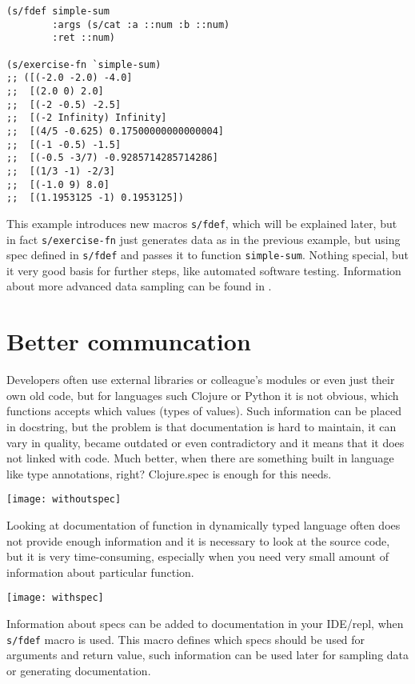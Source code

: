 \begin{verbatim}
(s/fdef simple-sum
        :args (s/cat :a ::num :b ::num)
        :ret ::num)

(s/exercise-fn `simple-sum)
;; ([(-2.0 -2.0) -4.0]
;;  [(2.0 0) 2.0]
;;  [(-2 -0.5) -2.5]
;;  [(-2 Infinity) Infinity]
;;  [(4/5 -0.625) 0.17500000000000004]
;;  [(-1 -0.5) -1.5]
;;  [(-0.5 -3/7) -0.9285714285714286]
;;  [(1/3 -1) -2/3]
;;  [(-1.0 9) 8.0]
;;  [(1.1953125 -1) 0.1953125])
\end{verbatim}

This example introduces new macros \texttt{s/fdef}, which will be explained
later, but in fact \texttt{s/exercise-fn} just generates data as in the previous
example, but using spec defined in \texttt{s/fdef} and passes it to function
\texttt{simple-sum}. Nothing special, but it very good basis for further steps,
like automated software testing. Information about more advanced data sampling
can be found in \cite{specific}.

\section{Better communcation}
\label{sec:bettercommunication}
Developers often use external libraries or colleague's modules or even just
their own old code, but for languages such Clojure or Python it is not obvious,
which functions accepts which values (types of values). Such information can be
placed in docstring, but the problem is that documentation is hard to maintain,
it can vary in quality, became outdated or even contradictory and it means that
it does not linked with code. Much better, when there are something built in
language like type annotations, right? Clojure.spec is enough for this needs.

\texttt{[image: withoutspec]}

Looking at documentation of function in dynamically typed language often does not
provide enough information and it is necessary to look at the source code, but
it is very time-consuming, especially when you need very small amount of
information about particular function.

\texttt{[image: withspec]}

Information about specs can be added to documentation in your IDE/repl, when
\texttt{s/fdef} macro is used. This macro defines which specs should be used for
arguments and return value, such information can be used later for sampling data
or generating documentation.

